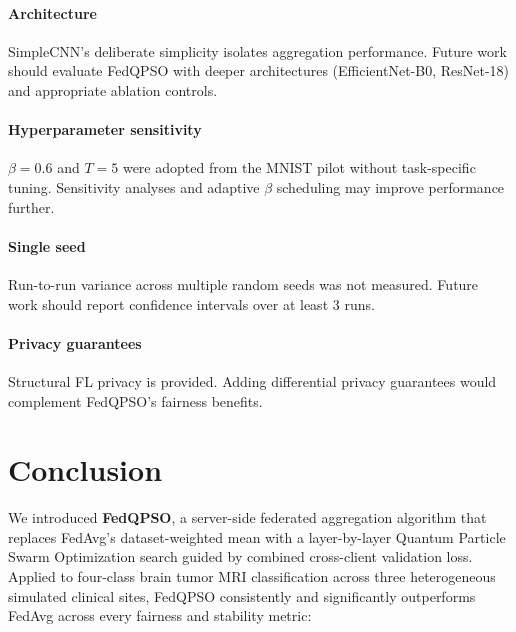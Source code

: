 \documentclass[conference]{IEEEtran}
\begin{document}
\paragraph{Architecture}
SimpleCNN's deliberate simplicity isolates aggregation performance.
Future work should evaluate FedQPSO with deeper architectures
(EfficientNet-B0, ResNet-18) and appropriate ablation controls.

\paragraph{Hyperparameter sensitivity}
$\beta = 0.6$ and $T = 5$ were adopted from the MNIST pilot
\cite{edla2025mnist} without task-specific tuning. Sensitivity analyses
and adaptive $\beta$ scheduling may improve performance further.

\paragraph{Single seed}
Run-to-run variance across multiple random seeds was not measured.
Future work should report confidence intervals over at least 3 runs.

\paragraph{Privacy guarantees}
Structural FL privacy is provided. Adding differential privacy
guarantees would complement FedQPSO's fairness benefits.

\section{Conclusion}
\label{sec:conclusion}

We introduced \textbf{FedQPSO}, a server-side federated aggregation algorithm
that replaces FedAvg's dataset-weighted mean with a layer-by-layer Quantum
Particle Swarm Optimization search guided by combined cross-client validation
loss. Applied to four-class brain tumor MRI classification across three
heterogeneous simulated clinical sites, FedQPSO consistently and significantly
outperforms FedAvg across every fairness and stability metric:
\end{document}
